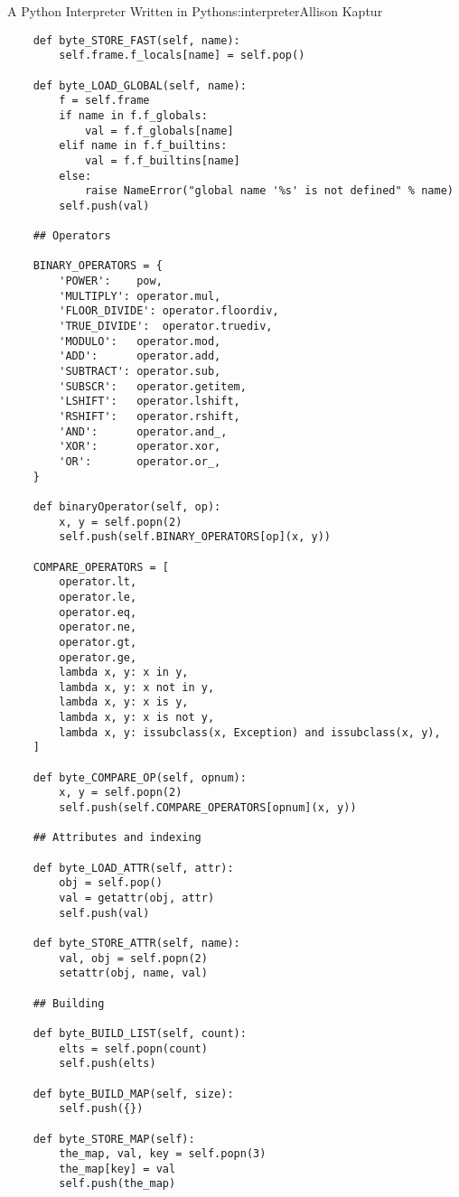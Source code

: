 \begin{aosachapter}{A Python Interpreter Written in Python}{s:interpreter}{Allison Kaptur}
\begin{verbatim}
    def byte_STORE_FAST(self, name):
        self.frame.f_locals[name] = self.pop()

    def byte_LOAD_GLOBAL(self, name):
        f = self.frame
        if name in f.f_globals:
            val = f.f_globals[name]
        elif name in f.f_builtins:
            val = f.f_builtins[name]
        else:
            raise NameError("global name '%s' is not defined" % name)
        self.push(val)

    ## Operators

    BINARY_OPERATORS = {
        'POWER':    pow,
        'MULTIPLY': operator.mul,
        'FLOOR_DIVIDE': operator.floordiv,
        'TRUE_DIVIDE':  operator.truediv,
        'MODULO':   operator.mod,
        'ADD':      operator.add,
        'SUBTRACT': operator.sub,
        'SUBSCR':   operator.getitem,
        'LSHIFT':   operator.lshift,
        'RSHIFT':   operator.rshift,
        'AND':      operator.and_,
        'XOR':      operator.xor,
        'OR':       operator.or_,
    }

    def binaryOperator(self, op):
        x, y = self.popn(2)
        self.push(self.BINARY_OPERATORS[op](x, y))

    COMPARE_OPERATORS = [
        operator.lt,
        operator.le,
        operator.eq,
        operator.ne,
        operator.gt,
        operator.ge,
        lambda x, y: x in y,
        lambda x, y: x not in y,
        lambda x, y: x is y,
        lambda x, y: x is not y,
        lambda x, y: issubclass(x, Exception) and issubclass(x, y),
    ]

    def byte_COMPARE_OP(self, opnum):
        x, y = self.popn(2)
        self.push(self.COMPARE_OPERATORS[opnum](x, y))

    ## Attributes and indexing

    def byte_LOAD_ATTR(self, attr):
        obj = self.pop()
        val = getattr(obj, attr)
        self.push(val)

    def byte_STORE_ATTR(self, name):
        val, obj = self.popn(2)
        setattr(obj, name, val)

    ## Building

    def byte_BUILD_LIST(self, count):
        elts = self.popn(count)
        self.push(elts)

    def byte_BUILD_MAP(self, size):
        self.push({})

    def byte_STORE_MAP(self):
        the_map, val, key = self.popn(3)
        the_map[key] = val
        self.push(the_map)


\end{verbatim}
\end{aosachapter}
